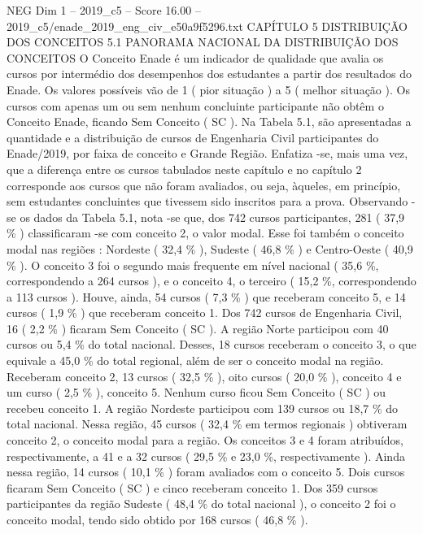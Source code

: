 \begin{textsample}{NEG Dim 1 – 2019\_c5 – Score 16.00 – 2019\_c5/enade\_2019\_eng\_civ\_e50a9f5296.txt}  \label{ex:f1_neg_398}
CAPÍTULO 5 DISTRIBUIÇÃO DOS CONCEITOS 5.1 PANORAMA NACIONAL DA DISTRIBUIÇÃO DOS CONCEITOS O Conceito Enade é um indicador de qualidade que avalia os cursos por intermédio dos desempenhos dos estudantes a partir dos resultados do Enade.
Os valores possíveis vão de 1 ( pior situação ) a 5 ( melhor situação ).
Os cursos com apenas um ou sem nenhum concluinte participante não obtêm o Conceito Enade, ficando Sem Conceito ( SC ).
Na Tabela 5.1, são apresentadas a quantidade e a distribuição de cursos de Engenharia Civil participantes do Enade/2019, por faixa de conceito e Grande Região.
Enfatiza -se, mais uma vez, que a diferença entre os cursos tabulados neste capítulo e no capítulo 2 corresponde aos cursos que não foram avaliados, ou seja, àqueles, em princípio, sem estudantes concluintes que tivessem sido inscritos para a prova.
Observando -se os dados da Tabela 5.1, nota -se que, dos 742 cursos participantes, 281 ( 37,9 \% ) classificaram -se com conceito 2, o valor modal.
Esse foi também o conceito modal nas regiões : Nordeste ( 32,4 \% ), Sudeste ( 46,8 \% ) e Centro-Oeste ( 40,9 \% ).
O conceito 3 foi o segundo mais frequente em nível nacional ( 35,6 \%, correspondendo a 264 cursos ), e o conceito 4, o terceiro ( 15,2 \%, correspondendo a 113 cursos ).
Houve, ainda, 54 cursos ( 7,3 \% ) que receberam conceito 5, e 14 cursos ( 1,9 \% ) que receberam conceito 1.
Dos 742 cursos de Engenharia Civil, 16 ( 2,2 \% ) ficaram Sem Conceito ( SC ).
A região Norte participou com 40 cursos ou 5,4 \% do total nacional.
Desses, 18 cursos receberam o conceito 3, o que equivale a 45,0 \% do total regional, além de ser o conceito modal na região.
Receberam conceito 2, 13 cursos ( 32,5 \% ), oito cursos ( 20,0 \% ), conceito 4 e um curso ( 2,5 \% ), conceito 5.
Nenhum curso ficou Sem Conceito ( SC ) ou recebeu conceito 1.
A região Nordeste participou com 139 cursos ou 18,7 \% do total nacional.
Nessa região, 45 cursos ( 32,4 \% em termos regionais ) obtiveram conceito 2, o conceito modal para a região.
Os conceitos 3 e 4 foram atribuídos, respectivamente, a 41 e a 32 cursos ( 29,5 \% e 23,0 \%, respectivamente ).
Ainda nessa região, 14 cursos ( 10,1 \% ) foram avaliados com o conceito 5.
Dois cursos ficaram Sem Conceito ( SC ) e cinco receberam conceito 1.
Dos 359 cursos participantes da região Sudeste ( 48,4 \% do total nacional ), o conceito 2 foi o conceito modal, tendo sido obtido por 168 cursos ( 46,8 \% ).

\end{textsample}
